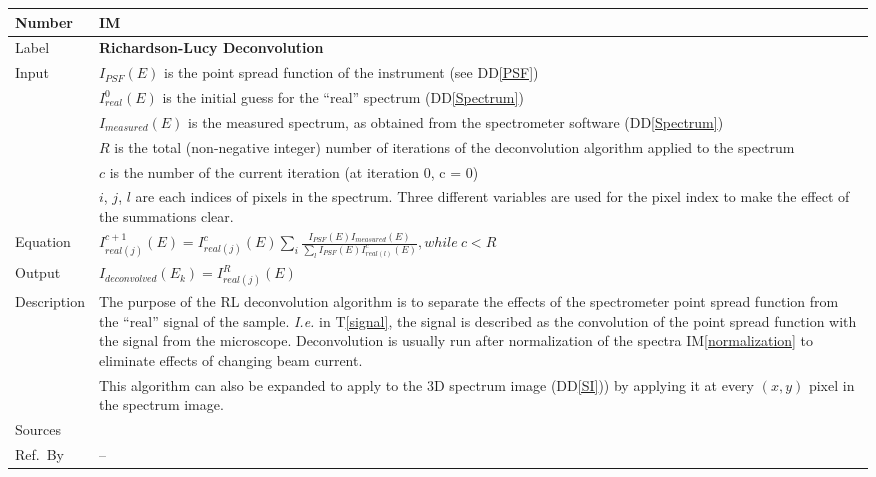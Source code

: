 \documentclass[12pt]{article}
\newcommand{\colAwidth}{0.13\textwidth}
\newcommand{\colBwidth}{0.82\textwidth}
\newcommand{\ddref}[1]{DD\ref{#1}}
\newcommand{\tref}[1]{T\ref{#1}}
\newcounter{instnum} %
\newcommand{\iref}[1]{IM\ref{#1}}
\begin{document}
\noindent
\begin{minipage}{\textwidth}
	\renewcommand*{\arraystretch}{1.5}
	\begin{tabular}{| p{\colAwidth} | p{\colBwidth}|}
		\hline
		\rowcolor[gray]{0.9}
		Number & IM{instnum}\theinstnum \label{deconvolution}\\
		\hline
		Label & \bf Richardson-Lucy Deconvolution\\
		\hline
		Input& $I_{PSF}(E)$ is the point spread function of the instrument (see \ddref{PSF})\\
		& $I_{real}^0(E)$ is the initial guess for the ``real'' spectrum (\ddref{Spectrum})\\
		& $I_{measured}(E)$ is the measured spectrum, as obtained from the spectrometer software (\ddref{Spectrum})\\
		& $R$ is the total (non-negative integer) number of iterations of the deconvolution algorithm applied to the spectrum \\
		& $c$ is the number of the current iteration (at iteration 0, c = 0)\\
		& $i$, $j$, $l$ are each indices of pixels in the spectrum. Three different variables are used for the pixel index to make the effect of the summations clear.\\
		\hline
		Equation & $I_{real (j)}^{c+1}(E)=I_{real (j)}^c(E)\sum_i{\frac{I_{PSF}(E)I_{measured}(E)}{\sum_l{I_{PSF}(E)I_{real (l)}^c(E)}}}, while\ c < R$\\
		\hline
		Output& $I_{deconvolved}(E_k)=I_{real (j)}^{R}(E)$\\
		\hline
		Description & The purpose of the RL deconvolution algorithm is to separate the effects of the spectrometer point spread function from the ``real'' signal of the sample. \textit{I.e.} in \tref{signal}, the signal is described as the convolution of the point spread function with the signal from the microscope. Deconvolution is usually run after normalization of the spectra \iref{normalization} to eliminate effects of changing beam current.\\
		& This algorithm can also  be expanded to apply to the 3D spectrum image (\ddref{SI})) by applying it at every $(x,y)$ pixel in the spectrum image.\\
		\hline
		Sources&~\cite{gloter_improving_2003, bellido_toward_2014} \ \\
		\hline
		Ref.\ By & --\\
		\hline
	\end{tabular}
\end{minipage}\\
\end{document}
